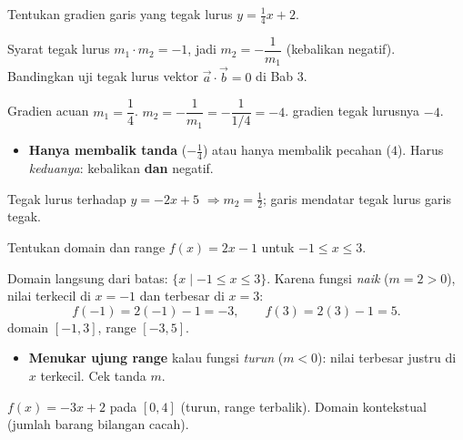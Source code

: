 \begin{soalbox}{}
Tentukan gradien garis yang tegak lurus $y=\tfrac14 x+2$.
\end{soalbox}

\begin{ingat}{Syarat tegak lurus}
$m_1\cdot m_2=-1$, jadi $m_2=-\dfrac{1}{m_1}$ (kebalikan negatif). Bandingkan uji
tegak lurus vektor $\vec a\cdot\vec b=0$ di Bab 3.
\end{ingat}

\jawab
{} Gradien acuan $m_1=\dfrac14$.
 $m_2=-\dfrac{1}{m_1}=-\dfrac{1}{1/4}=-4$.
\jadi gradien tegak lurusnya $-4$.

\begin{jebakan}
\begin{itemize}[leftmargin=*,topsep=2pt]
  \item \textbf{Hanya membalik tanda} ($-\frac14$) atau hanya membalik pecahan
  ($4$). Harus \emph{keduanya}: kebalikan \textbf{dan} negatif.
\end{itemize}
\end{jebakan}

\begin{variasi}
Tegak lurus terhadap $y=-2x+5$ $\Rightarrow m_2=\frac12$; garis mendatar tegak
lurus garis tegak.
\end{variasi}

\begin{soalbox}{}
Tentukan domain dan range $f(x)=2x-1$ untuk $-1\le x\le3$.
\end{soalbox}

\jawab
{} Domain langsung dari batas: $\{x\mid -1\le x\le3\}$.
 Karena fungsi \emph{naik} ($m=2>0$), nilai terkecil di $x=-1$ dan
terbesar di $x=3$:
\[
f(-1)=2(-1)-1=-3,\qquad f(3)=2(3)-1=5.
\]
\jadi domain $[-1,3]$, range $[-3,5]$.

\begin{jebakan}
\begin{itemize}[leftmargin=*,topsep=2pt]
  \item \textbf{Menukar ujung range} kalau fungsi \emph{turun} ($m<0$): nilai
  terbesar justru di $x$ terkecil. Cek tanda $m$.
\end{itemize}
\end{jebakan}

\begin{variasi}
$f(x)=-3x+2$ pada $[0,4]$ (turun, range terbalik). Domain kontekstual (jumlah
barang bilangan cacah).
\end{variasi}

